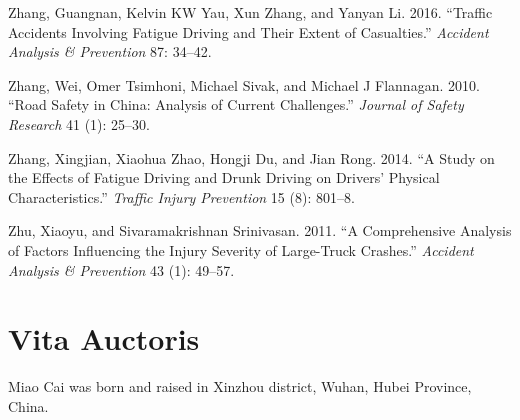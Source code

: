 \documentclass[12pt]{book}
\numberwithin{equation}{chapter}
\begin{document}
\leavevmode\hypertarget{ref-zhang2016traffic}{}%
Zhang, Guangnan, Kelvin KW Yau, Xun Zhang, and Yanyan Li. 2016. ``Traffic Accidents Involving Fatigue Driving and Their Extent of Casualties.'' \emph{Accident Analysis \& Prevention} 87: 34--42.

\leavevmode\hypertarget{ref-zhang2010road}{}%
Zhang, Wei, Omer Tsimhoni, Michael Sivak, and Michael J Flannagan. 2010. ``Road Safety in China: Analysis of Current Challenges.'' \emph{Journal of Safety Research} 41 (1): 25--30.

\leavevmode\hypertarget{ref-zhang2014study}{}%
Zhang, Xingjian, Xiaohua Zhao, Hongji Du, and Jian Rong. 2014. ``A Study on the Effects of Fatigue Driving and Drunk Driving on Drivers' Physical Characteristics.'' \emph{Traffic Injury Prevention} 15 (8): 801--8.

\leavevmode\hypertarget{ref-zhu2011comprehensive}{}%
Zhu, Xiaoyu, and Sivaramakrishnan Srinivasan. 2011. ``A Comprehensive Analysis of Factors Influencing the Injury Severity of Large-Truck Crashes.'' \emph{Accident Analysis \& Prevention} 43 (1): 49--57.

\hypertarget{vita-auctoris}{%
\chapter*{Vita Auctoris}\label{vita-auctoris}}

Miao Cai was born and raised in Xinzhou district, Wuhan, Hubei Province, China.







\backmatter
\printindex
\end{document}
